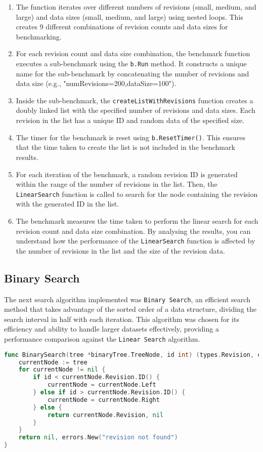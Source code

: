 \begin{enumerate}
	\item The function iterates over different numbers of revisions (small, medium, and large) and data sizes (small, medium, and large) using nested loops. This creates 9 different combinations of revision counts and data sizes for benchmarking.
	\item For each revision count and data size combination, the benchmark function executes a sub-benchmark using the \lstinline{b.Run} method. It constructs a unique name for the sub-benchmark by concatenating the number of revisions and data size (e.g., "numRevisions=200,dataSize=100").
	\item Inside the sub-benchmark, the \lstinline{createListWithRevisions} function creates a doubly linked list with the specified number of revisions and data sizes. Each revision in the list has a unique ID and random data of the specified size.
	\item The timer for the benchmark is reset using \lstinline{b.ResetTimer()}. This ensures that the time taken to create the list is not included in the benchmark results.
	\item For each iteration of the benchmark, a random revision ID is generated within the range of the number of revisions in the list. Then, the \lstinline{LinearSearch} function is called to search for the node containing the revision with the generated ID in the list.
	\item The benchmark measures the time taken to perform the linear search for each revision count and data size combination. By analysing the results, you can understand how the performance of the \lstinline{LinearSearch} function is affected by the number of revisions in the list and the size of the revision data.
\end{enumerate}

\subsection{Binary Search}
The next search algorithm implemented was \lstinline{Binary Search}, an efficient search method that takes advantage of the sorted order of a data structure, dividing the search interval in half with each iteration. This algorithm was chosen for its efficiency and ability to handle larger datasets effectively, providing a performance comparison against the \lstinline{Linear Search} algorithm.

\begin{lstlisting}[language=go]
func BinarySearch(tree *binaryTree.TreeNode, id int) (types.Revision, error) {
	currentNode := tree
	for currentNode != nil {
		if id < currentNode.Revision.ID() {
			currentNode = currentNode.Left
		} else if id > currentNode.Revision.ID() {
			currentNode = currentNode.Right
		} else {
			return currentNode.Revision, nil
		}
	}
	return nil, errors.New("revision not found")
}
\end{lstlisting}
\medskip

